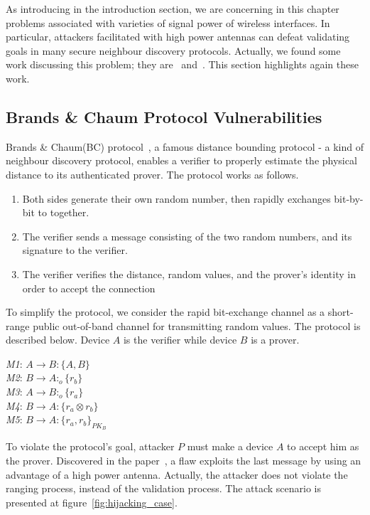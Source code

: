 As introducing in the introduction section, we are concerning in this chapter problems associated with varieties of signal power of wireless interfaces. In particular, attackers facilitated with high power antennas can defeat validating goals in many secure neighbour discovery protocols. Actually, we found some work discussing this problem; they are~\cite{6234408} and~\cite{lin2006}. This section highlights again these work.  

\subsection{Brands \& Chaum Protocol Vulnerabilities}

Brands \& Chaum(BC) protocol~\cite{Brands:1994aa}, a famous distance bounding protocol - a kind of neighbour discovery protocol, enables a verifier to properly estimate the physical distance to its authenticated prover. The protocol works as follows.
\begin{enumerate}
\item Both sides generate their own random number, then rapidly exchanges bit-by-bit to together.
\item The verifier sends a message consisting of the two random numbers, and its signature to the verifier. 
\item The verifier verifies the distance, random values, and the prover's identity in order to accept the connection
\end{enumerate}

To simplify the protocol, we consider the rapid bit-exchange channel as a short-range public out-of-band channel for transmitting random values. The protocol is described below. Device $A$ is the verifier while device $B$ is a prover.

\begin{center}
\begin{flushleft}
 \emph{M1}: $A \rightarrow B :\{A,B\}$ \\
\emph{M2}: $B \rightarrow A :_o\{r_b\}$ \\
\emph{M3}: $A \rightarrow B : _o\{r_a\}$\\
\emph{M4}: $B \rightarrow A :\{r_a \otimes r_b\}$ \\
\emph{M5}: $B \rightarrow A : \{r_a,r_b\}_{PK_B}$
\end{flushleft}
\end{center}

To violate the protocol's goal, attacker $P$ must make a device $A$ to accept him as the prover. Discovered in the paper~\cite{6234408}, a flaw exploits the last message by using an advantage of a high power antenna. Actually, the attacker does not violate the ranging process, instead of the validation process. The attack scenario is presented at figure~\ref{fig:hijacking_case}. 

